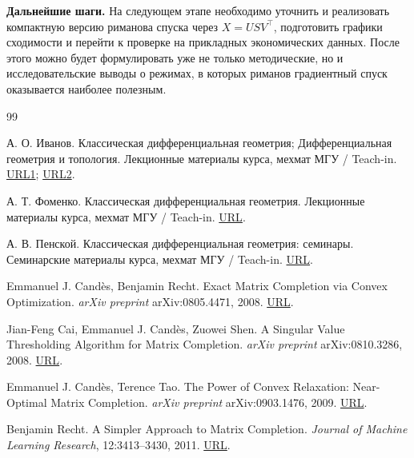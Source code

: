 \documentclass[a4paper,12pt]{article}
\begin{document}
\textbf{Дальнейшие шаги.} На следующем этапе необходимо уточнить и реализовать компактную версию риманова спуска через $X=USV^\top$, подготовить графики сходимости и перейти к проверке на прикладных экономических данных. После этого можно будет формулировать уже не только методические, но и исследовательские выводы о режимах, в которых риманов градиентный спуск оказывается наиболее полезным.

\begin{thebibliography}{99}

    А. О. Иванов.
    \newblock Классическая дифференциальная геометрия; Дифференциальная геометрия и топология.
    \newblock Лекционные материалы курса, мехмат МГУ / Teach-in.
    \newblock \href{https://teach-in.ru/course/differential-geometry-and-tensor-analysis-ivanov}{URL1};
    \href{https://teach-in.ru/course/differential-geometry-and-tensor-analysis-ivanov-p2}{URL2}.

    А. Т. Фоменко.
    \newblock Классическая дифференциальная геометрия.
    \newblock Лекционные материалы курса, мехмат МГУ / Teach-in.
    \newblock \href{https://teach-in.ru/course/classical-difgeom-fomenko/about}{URL}.

    А. В. Пенской.
    \newblock Классическая дифференциальная геометрия: семинары.
    \newblock Семинарские материалы курса, мехмат МГУ / Teach-in.
    \newblock \href{https://teach-in.ru/course/kdg-seminars-penskoy/about}{URL}.

    Emmanuel J. Cand\`es, Benjamin Recht.
    \newblock Exact Matrix Completion via Convex Optimization.
    \newblock \textit{arXiv preprint} arXiv:0805.4471, 2008.
    \newblock \href{https://arxiv.org/abs/0805.4471}{URL}.

    Jian-Feng Cai, Emmanuel J. Cand\`es, Zuowei Shen.
    \newblock A Singular Value Thresholding Algorithm for Matrix Completion.
    \newblock \textit{arXiv preprint} arXiv:0810.3286, 2008.
    \newblock \href{https://arxiv.org/abs/0810.3286}{URL}.

    Emmanuel J. Cand\`es, Terence Tao.
    \newblock The Power of Convex Relaxation: Near-Optimal Matrix Completion.
    \newblock \textit{arXiv preprint} arXiv:0903.1476, 2009.
    \newblock \href{https://arxiv.org/abs/0903.1476}{URL}.

    Benjamin Recht.
    \newblock A Simpler Approach to Matrix Completion.
    \newblock \textit{Journal of Machine Learning Research}, 12:3413--3430, 2011.
    \newblock \href{https://www.jmlr.org/papers/v12/recht11a.html}{URL}.


\end{thebibliography}
\end{document}
